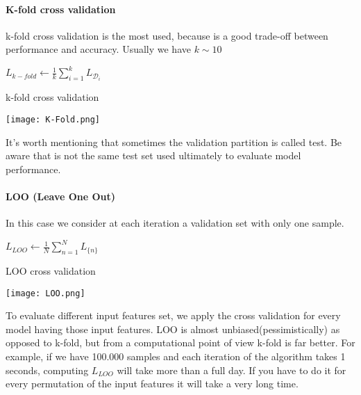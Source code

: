 \documentclass[main.tex]{subfiles}
\begin{document}
\paragraph{K-fold cross validation}
k-fold cross validation is the most used, because is a good trade-off between performance and accuracy. Usually we have $k \sim 10$\\
\begin{algorithm}[H]
\SetAlgoLined
{}
$L_{k-fold} \leftarrow \frac{1}{k} \sum_{i=1}^k L_{\mathcal{D}_i}$
\caption{k-fold cross validation}
\end{algorithm}

\begin{center}
    \texttt{[image: K-Fold.png]}
\end{center}
It's worth mentioning that sometimes the validation partition is called test. Be aware that is not the same test set used ultimately to evaluate model performance.

\paragraph{LOO (Leave One Out)} In this case we consider at each iteration a validation set with only one sample. \\
\begin{algorithm}[H]
\SetAlgoLined
{}
$L_{LOO} \leftarrow \frac{1}{N} \sum_{n=1}^N L_{\{n\}}$
\caption{LOO cross validation}
\end{algorithm}

\begin{center}
   \texttt{[image: LOO.png]}
\end{center}
To evaluate different input features set, we apply the cross validation for every model having those input features.
LOO is almost unbiased(pessimistically) as opposed to k-fold, but from a computational point of view k-fold is far better. For example, if we have 100.000 samples and each iteration of the algorithm takes 1 seconds, computing $L_{LOO}$ will take more than a full day. If you have to do it for every permutation of the input features it will take a very long time.
\end{document}
